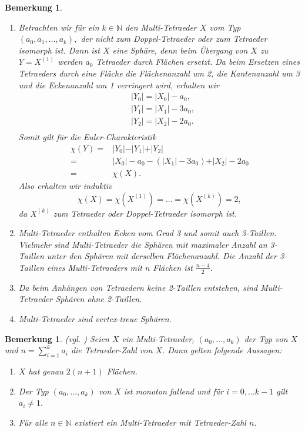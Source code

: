 \documentclass[12pt,titlepage,twoside,cleardoublepage]{article}
\theoremstyle{nummermitklammern}
\newtheorem{bemerkung}[temp]{Bemerkung}
\newtheorem{bemerkung}[zahl]{Bemerkung}
\numberwithin{equation}{section}
\begin{document}
\begin{bemerkung}
\begin{enumerate}
\item Betrachten wir für ein $k\in \mathbb{N}$ den Multi-Tetraeder $X$ vom Typ $(a_0,a_1,\ldots,a_k),$ der nicht zum Doppel-Tetraeder oder zum Tetraeder isomorph ist. Dann ist $X$ eine Sphäre, denn beim Übergang von $X$ zu $Y=X^{(1)}$ werden $a_0$ Tetraeder durch Flächen ersetzt. Da beim Ersetzen eines Tetraeders durch eine Fläche die Flächenanzahl um 2, die Kantenanzahl um 3 und die Eckenanzahl um 1 verringert wird, erhalten wir  
\begin{align*}
&\vert Y_0\vert =\vert X_0\vert-a_0,\\
&\vert Y_1\vert=\vert X_1\vert-3a_0,\\
&\vert Y_2\vert=\vert X_2\vert-2a_0.\\
\end{align*}
Somit gilt für die Euler-Charakteristik
\begin{align*}
\chi(Y)=&\vert Y_0\vert -\vert Y_1\vert+\vert Y_2\vert\\
=&\vert X_0\vert-a_0-(\vert X_1\vert-3a_0)+\vert X_2\vert-2a_0\\
=&\chi (X).
\end{align*}
Also erhalten wir induktiv 
\[
\chi(X)=\chi(X^{(1)})=\ldots=\chi(X^{(k)})=2,
\]
da $X^{(k)}$ zum Tetraeder oder Doppel-Tetraeder isomorph ist.
\item Multi-Tetraeder enthalten Ecken vom Grad 3 und somit auch 3-Taillen. Vielmehr sind Multi-Tetraeder die Sphären mit maximaler Anzahl an 3-Taillen unter den Sphären mit derselben Flächenanzahl. Die Anzahl der 3-Taillen eines Multi-Tetraeders mit $n$ Flächen ist $\frac{n-4}{2}.$

\item
Da beim Anhängen von Tetraedern keine 2-Taillen entstehen, sind Multi-Tetraeder Sphären ohne 2-Taillen.
\item
Multi-Tetraeder sind vertex-treue Sphären.
\end{enumerate}
\end{bemerkung}
\begin{bemerkung}{\textsc{(}vgl. \textsc{\cite{simp})}}
Seien $X$ ein Multi-Tetraeder, $(a_0,\ldots,a_k)$ der Typ von $X$ und $n=\sum_{i=1}^{k}a_i$ die Tetraeder-Zahl von $X$. Dann gelten folgende Aussagen: 
\begin{enumerate}
\item $X$ hat genau $2(n+1)$ Flächen. 
\item Der Typ $(a_0,\ldots,a_k)$ von $X$ ist monoton fallend und für $i=0,\ldots k-1$ gilt $a_i\neq 1.$
\item  Für alle $n \in \mathbb{N}$ existiert ein Multi-Tetraeder mit Tetraeder-Zahl $n$.
\end{enumerate}
\end{bemerkung}
\end{document}
